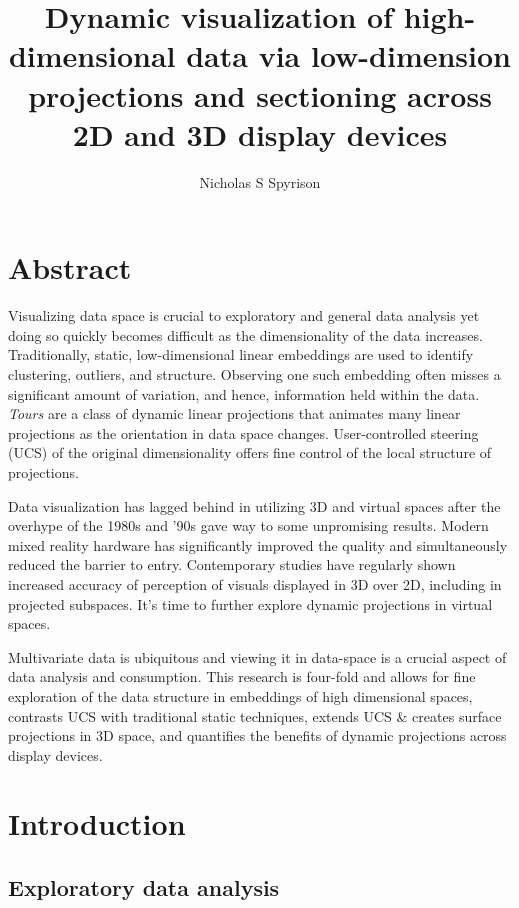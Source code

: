 \documentclass{monashthesis}
\author{Nicholas S Spyrison}
\title{Dynamic visualization of high-dimensional data via low-dimension
projections and sectioning across 2D and 3D display devices}
\begin{document}

\titlepage

{\sf\tighttoc\doublespacing}

\chapter*{Abstract}\label{abstract}

Visualizing data space is crucial to exploratory and general data
analysis yet doing so quickly becomes difficult as the dimensionality of
the data increases. Traditionally, static, low-dimensional linear
embeddings are used to identify clustering, outliers, and structure.
Observing one such embedding often misses a significant amount of
variation, and hence, information held within the data. \emph{Tours} are
a class of dynamic linear projections that animates many linear
projections as the orientation in data space changes. User-controlled
steering (UCS) of the original dimensionality offers fine control of the
local structure of projections.

Data visualization has lagged behind in utilizing 3D and virtual spaces
after the overhype of the 1980s and '90s gave way to some unpromising
results. Modern mixed reality hardware has significantly improved the
quality and simultaneously reduced the barrier to entry. Contemporary
studies have regularly shown increased accuracy of perception of visuals
displayed in 3D over 2D, including in projected subspaces. It's time to
further explore dynamic projections in virtual spaces.

Multivariate data is ubiquitous and viewing it in data-space is a
crucial aspect of data analysis and consumption. This research is
four-fold and allows for fine exploration of the data structure in
embeddings of high dimensional spaces, contrasts UCS with traditional
static techniques, extends UCS \& creates surface projections in 3D
space, and quantifies the benefits of dynamic projections across display
devices.

\clearpage{}\setcounter{page}{0}

\chapter{Introduction}\label{ch:introduction}

\section{Exploratory data analysis}\label{exploratory-data-analysis}
\end{document}
